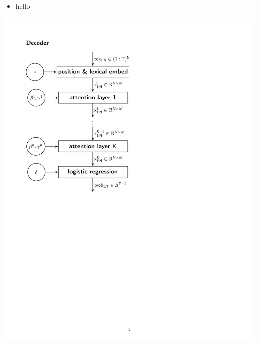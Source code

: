 \documentclass[9pt]{report}
\begin{document}
{  
\begin{center}\hfill
  \vspace*{-3in}
  \begin{minipage}[t]{2in}
    \begin{itemize}
    \item hello
    \end{itemize}
  \end{minipage}\hfill
\vspace*{-24pt}
\hfill\includegraphics[height=\textheight]{img/transformer-diagram.pdf}
\end{center}

}
\end{document}

